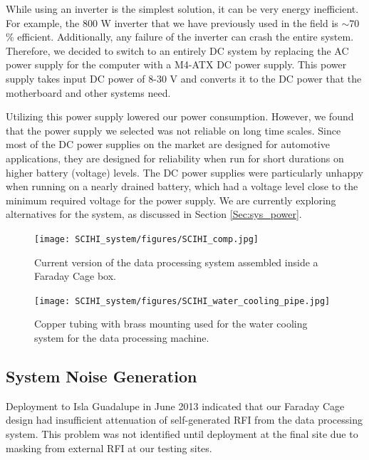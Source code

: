 While using an inverter is the simplest solution, it can be very energy inefficient. For example, the 800 W inverter that we have previously used in the field is $\sim70$\% efficient. Additionally, any failure of the inverter can crash the entire system. Therefore, we decided to switch to an entirely DC system by replacing the AC power supply for the computer with a M4-ATX DC power supply. This power supply takes input DC power of 8-30 V and converts it to the DC power that the motherboard and other systems need. 

Utilizing this power supply lowered our power consumption. However, we found that the power supply we selected was not reliable on long time scales. Since most of the DC power supplies on the market are designed for automotive applications, they are designed for reliability when run for short durations on higher battery (voltage) levels. The DC power supplies were particularly unhappy when running on a nearly drained battery, which had a voltage level close to the minimum required voltage for the power supply. We are currently exploring alternatives for the system, as discussed in Section \ref{Sec:sys_power}. 

\begin{figure}[htb]
\centering
\begin{minipage}[b]{0.52\textwidth}
\centering
\texttt{[image: SCIHI\_system/figures/SCIHI\_comp.jpg]}
\caption{Current version of the data processing system assembled inside a Faraday Cage box.}
\label{Fig:new_comp}
\end{minipage}%
\begin{minipage}[b]{0.02\textwidth}
\hspace{1cm}
\end{minipage}%
\begin{minipage}[b]{0.44\textwidth}
\centering
\texttt{[image: SCIHI\_system/figures/SCIHI\_water\_cooling\_pipe.jpg]}
\caption{Copper tubing with brass mounting used for the water cooling system for the data processing machine.}
\label{Fig:water_pipe}
\end{minipage}
\end{figure}


\subsection{System Noise Generation} \label{Sec:sys_noise}

Deployment to Isla Guadalupe in June 2013 indicated that our Faraday Cage design had insufficient attenuation of self-generated RFI from the data processing system. This problem was not identified until deployment at the final site due to masking from external RFI at our testing sites. 

